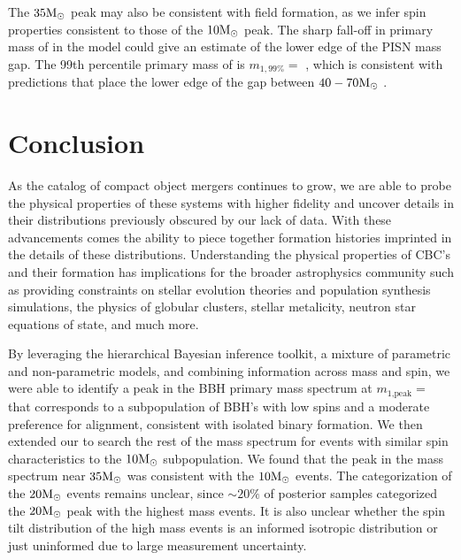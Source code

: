 The $35{\rm M}_\odot$ peak may also be consistent with field formation, as we infer spin properties consistent to those of the $10{\rm M}_\odot$ peak. The sharp fall-off in primary mass of \contA{} in the \comp{} model could give an estimate of the lower edge of the PISN mass gap. The 99th percentile primary mass of \contA{} is $m_{1,99\%} = $ \result{$\CIPlusMinus{\macros[Mass][Composite][ContinuumA][99percentile]}$ \msun}, which is consistent with predictions that place the lower edge of the gap between $40-70{\rm M}_\odot$ \citep{1901.00215,2103.07933v1,1910.12874v1,2104.07783v2}. 

\section{Conclusion} \label{sec:conclusion}


As the catalog of compact object mergers continues to grow, we are able to probe the physical properties of these systems with higher fidelity and uncover details in their distributions previously obscured by our lack of data. With these advancements comes the ability to piece together formation histories imprinted in the details of these distributions. Understanding the physical properties of CBC's and their formation has implications for the broader astrophysics community such as providing constraints on stellar evolution theories and population synthesis simulations, the physics of globular clusters, stellar metalicity, neutron star equations of state, and much more. 

By leveraging the hierarchical Bayesian inference toolkit, a mixture of parametric and non-parametric models, and combining information across mass and spin, we were able to identify a peak in the BBH primary mass spectrum at $m_\text{1,peak} = $ \result{$\CIPlusMinus{\macros[Mass][Base][PeakA][max]}$ \msun} that corresponds to a subpopulation of BBH's with low spins and a moderate preference for alignment, consistent with isolated binary formation. We then extended our \base{} to search the rest of the mass spectrum for events with similar spin characteristics to the $10{\rm M}_\odot$ subpopulation. We found that the peak in the mass spectrum near $35{\rm M}_\odot$ was consistent with the $10{\rm M}_\odot$ events. The categorization of the $20{\rm M}_\odot$ events remains unclear, since $\sim20\%$ of posterior samples categorized the $20{\rm M}_\odot$ peak with the highest mass events. It is also unclear whether the spin tilt distribution of the high mass events is an informed isotropic distribution or just uninformed due to large measurement uncertainty. 

